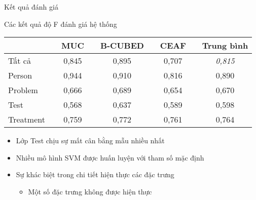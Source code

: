 \begin{frame}{Kết quả đánh giá}
\putlogo
\vspace{-0.25cm}
\begin{center}
	Các kết quả độ F đánh giá hệ thống\vspace{0.1cm}
	\renewcommand{\tabcolsep}{3pt}
	\footnotesize\sffamily
	\begin{tabular}{lcccccccc}
	\toprule
	&\phantom{a}&\textbf{MUC}&\phantom{a}&\textbf{B-CUBED}&\phantom{a}&\textbf{CEAF}&\phantom{a}&\textbf{Trung bình}\\
	\midrule
	Tất cả && 0,845 && 0,895 && 0,707 && \emph{0,815}\\\cmidrule{1-9}
	Person && 0,944 && 0,910 && 0,816 && 0,890 \\\cmidrule{1-9}
	Problem && 0,666 && 0,689 && 0,654 && 0,670 \\\cmidrule{1-9}
	Test && 0,568 && 0,637 && 0,589 && 0,598 \\\cmidrule{1-9}
	Treatment && 0,759 && 0,772 && 0,761 && 0,764 \\
	\bottomrule
	\end{tabular}
\end{center}
\begin{itemize}
	\item Lớp Test chịu sự mất cân bằng mẫu nhiều nhất
	\item Nhiều mô hình SVM được huấn luyện với tham số mặc định
	\item Sự khác biệt trong chi tiết hiện thực các đặc trưng
	\begin{itemize}
		\item Một số đặc trưng không được hiện thực
	\end{itemize}
\end{itemize}
\end{frame}

